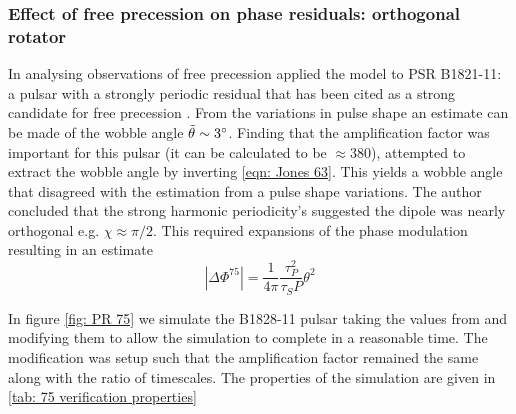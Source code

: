 \subsubsection{Effect of free precession on phase residuals: orthogonal rotator}

In analysing observations of free precession \citet{Jones2001} applied the
model to PSR B1821-11: a pulsar with a strongly periodic residual that has been
cited as a strong candidate for free precession \citet{Stairs2000}. From the
variations in pulse shape an estimate can be made of the wobble angle
$\tilde{\theta} \sim 3^{\circ}$. Finding that the amplification factor was
important for this pulsar (it can be calculated to be $\approx 380$), 
\citet{Jones2001} attempted to extract the wobble
angle by inverting \eqref{eqn: Jones 63}. This yields a wobble angle that
disagreed with the estimation from a pulse shape variations. The author
concluded that the strong harmonic periodicity's suggested the dipole was
nearly orthogonal e.g. $\chi \approx \pi/2$.  This required expansions of the
phase modulation resulting in an estimate
\begin{equation}
    |\Delta\Phi^{75}| = \frac{1}{4\pi} \frac{\tau_{P}^{2}}{\tau_{S} P} \theta^{2}
    \label{eqn: Jones 75}
\end{equation}

In figure \ref{fig: PR 75} we simulate the B1828-11 pulsar taking the values
from \citet{Stairs2000} and modifying them to allow the simulation to complete
in a reasonable time. The modification was setup such that the amplification
factor remained the same along with the ratio of timescales. The properties
of the simulation are given in \ref{tab: 75 verification properties}

\begin{figure}[htb]
\begin{floatrow}
\capbtabbox{%
  
}{%
  \caption{}%
  \label{tab: 75 verification properties}
}
\end{floatrow}
\end{figure}




